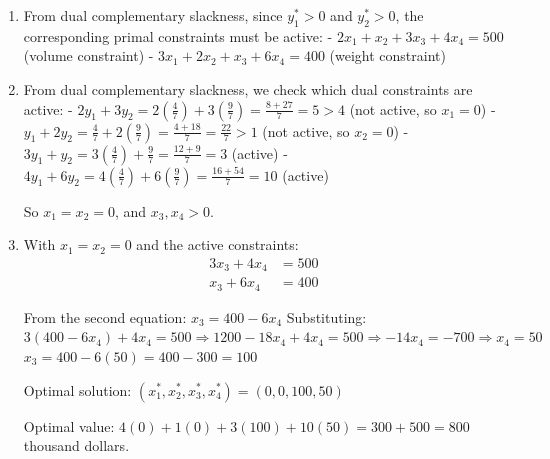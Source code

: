 \documentclass[11pt]{article}
\begin{document}
\begin{enumerate}
\begin{enumerate}
        \item From dual complementary slackness, since $y_1^* > 0$ and $y_2^* > 0$, the corresponding primal constraints must be active:
              - $2x_1 + x_2 + 3x_3 + 4x_4 = 500$ (volume constraint)
              - $3x_1 + 2x_2 + x_3 + 6x_4 = 400$ (weight constraint)

        \item From dual complementary slackness, we check which dual constraints are active:
              - $2y_1 + 3y_2 = 2(\frac{4}{7}) + 3(\frac{9}{7}) = \frac{8 + 27}{7} = 5 > 4$ (not active, so $x_1 = 0$)
              - $y_1 + 2y_2 = \frac{4}{7} + 2(\frac{9}{7}) = \frac{4 + 18}{7} = \frac{22}{7} > 1$ (not active, so $x_2 = 0$)
              - $3y_1 + y_2 = 3(\frac{4}{7}) + \frac{9}{7} = \frac{12 + 9}{7} = 3$ (active)
              - $4y_1 + 6y_2 = 4(\frac{4}{7}) + 6(\frac{9}{7}) = \frac{16 + 54}{7} = 10$ (active)
              
              So $x_1 = x_2 = 0$, and $x_3, x_4 > 0$.

        \item With $x_1 = x_2 = 0$ and the active constraints:
              \begin{align*}
              3x_3 + 4x_4 &= 500 \\
              x_3 + 6x_4 &= 400
              \end{align*}
              
              From the second equation: $x_3 = 400 - 6x_4$
              Substituting: $3(400 - 6x_4) + 4x_4 = 500 \Rightarrow 1200 - 18x_4 + 4x_4 = 500 \Rightarrow -14x_4 = -700 \Rightarrow x_4 = 50$
              $x_3 = 400 - 6(50) = 400 - 300 = 100$
              
              Optimal solution: $(x_1^*, x_2^*, x_3^*, x_4^*) = (0, 0, 100, 50)$
              
              Optimal value: $4(0) + 1(0) + 3(100) + 10(50) = 300 + 500 = 800$ thousand dollars.
    \end{enumerate}


\end{enumerate}
\end{document}
